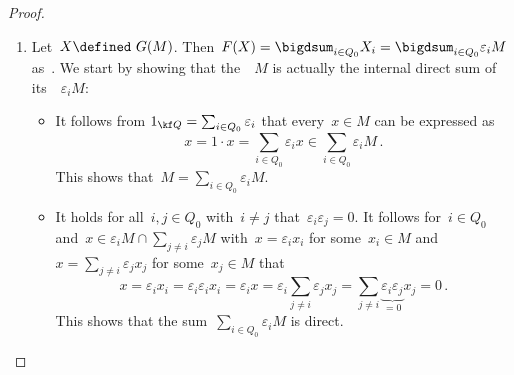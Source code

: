 \begin{proof}
  \leavevmode
  \begin{enumerate}
    \item
      Let~$X \defined\ G(M)$.
      Then~$F(X) = \bigdsum_{i \in Q_0} X_i = \bigdsum_{i \in Q_0} \varepsilon_i M$ as~{\modules{$\kf$}}.
      We start by showing that the~{}~$M$ is actually the internal direct sum of its~{\submodules{$\kf$}}~$\varepsilon_i M$:
      \begin{itemize}
        \item
          It follows from $1_{\kf Q} = \sum_{i \in Q_0} \varepsilon_i$ that every~$x \in M$ can be expressed as
          \[
                x
            =   1 \cdot x
            =   \sum_{i \in Q_0} \varepsilon_i x
            \in \sum_{i \in Q_0} \varepsilon_i M \,.
          \]
          This shows that~$M = \sum_{i \in Q_0} \varepsilon_i M$.
        \item
          It holds for all~$i, j \in Q_0$ with~$i \neq j$ that~$\varepsilon_i \varepsilon_j = 0$.
          It follows for~$i \in Q_0$ and~$x \in \varepsilon_i M \cap \sum_{j \neq i} \varepsilon_j M$ with~$x = \varepsilon_i x_i$ for some~$x_i \in M$ and~$x = \sum_{j \neq i} \varepsilon_j x_j$ for some~$x_j \in M$ that
          \[
              x
            = \varepsilon_i x_i
            = \varepsilon_i \varepsilon_i x_i
            = \varepsilon_i x
            = \varepsilon_i \sum_{j \neq i} \varepsilon_j x_j
            = \sum_{j \neq i} \underbrace{\varepsilon_i \varepsilon_j}_{=0} x_j
            = 0 \,.
          \]
          This shows that the sum~$\sum_{i \in Q_0} \varepsilon_i M$ is direct.
      \end{itemize}
      

\end{enumerate}
\end{proof}
